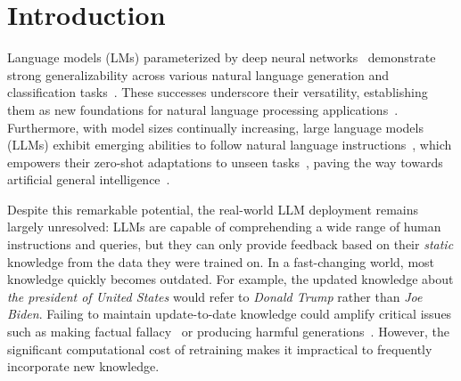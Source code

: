 \section{Introduction}
\label{sec:intro}


Language models (LMs) parameterized by deep neural networks~\citep{vaswani2017attention,lewis2019bart,radford2019language,brown2020language}
demonstrate strong generalizability across various natural language generation and classification tasks~\citep{see2019massively,raffel2020exploring, ji2023survey}.
These successes underscore their versatility, establishing them as new foundations for natural language processing applications~\citep{bommasani2021opportunities,zhou2023comprehensive}. 
Furthermore, with model sizes continually increasing, 
large language models (LLMs) exhibit emerging abilities to follow natural language instructions~\citep{dong2022survey,ouyang2022training}, 
which empowers their zero-shot adaptations to unseen tasks~\citep{kojima2022large}, paving the way towards artificial general intelligence~\citep{bubeck2023sparks}. 


Despite this remarkable potential, the real-world LLM deployment remains largely unresolved: 
LLMs are capable of comprehending a wide range of human instructions and queries, 
but they can only provide feedback based on their \textit{static} knowledge from the data they were trained on. 
In a fast-changing world, most knowledge quickly becomes outdated. 
For example, the updated knowledge about \textit{the president of United States} would refer to \textit{Donald Trump} rather than \textit{Joe Biden}. 
Failing to maintain update-to-date knowledge could amplify critical issues such as making factual fallacy~\citep{de2021editing} or producing harmful generations~\citep{hartvigsen2022toxigen}.
However, the significant computational cost of retraining makes it impractical to frequently incorporate new knowledge.




